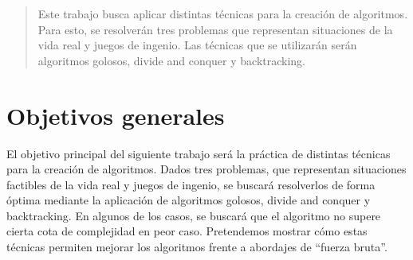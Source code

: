 \documentclass[a4paper]{article}
\begin{document}

\thispagestyle{empty}

\maketitle
\newpage

\thispagestyle{empty}
\vfill
\begin{abstract}
    \vspace{0.5cm}
	Este trabajo busca aplicar distintas técnicas para la creación de algoritmos. Para esto, se resolverán tres problemas que representan situaciones de la vida real y juegos de ingenio. Las técnicas que se utilizarán serán algoritmos golosos, divide and conquer y backtracking.

\end{abstract}

\thispagestyle{empty}
\vspace{1.5cm}
\tableofcontents
\newpage


\newpage
\section{Objetivos generales}

El objetivo principal del siguiente trabajo será la práctica de distintas técnicas para la creación de algoritmos. Dados tres problemas, que representan situaciones factibles de la vida real y juegos de ingenio, se buscará resolverlos de forma óptima mediante la aplicación de algoritmos golosos, divide and conquer y backtracking.  En algunos de los casos, se buscará que el algoritmo no supere cierta cota de complejidad en peor caso.  Pretendemos mostrar cómo estas técnicas permiten mejorar los algoritmos frente a abordajes de ``fuerza bruta''.
\end{document}
